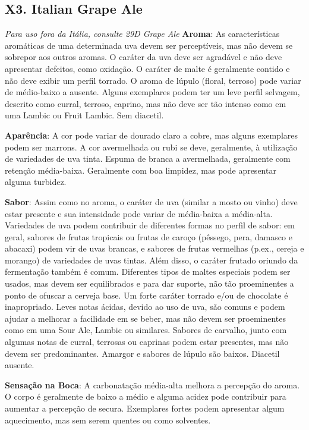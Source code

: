 \subsection*{X3. Italian Grape Ale}

\textit{Para uso fora da Itália, consulte 29D Grape Ale}
\textbf{Aroma}: As características aromáticas de uma determinada uva devem ser perceptíveis, mas não devem se sobrepor aos outros aromas. O caráter da uva deve ser agradável e não deve apresentar defeitos, como oxidação. O caráter de malte é geralmente contido e não deve exibir um perfil torrado. O aroma de lúpulo (floral, terroso) pode variar de médio-baixo a ausente. Alguns exemplares podem ter um leve perfil selvagem, descrito como curral, terroso, caprino, mas não deve ser tão intenso como em uma Lambic ou Fruit Lambic. Sem diacetil.

\textbf{Aparência}: A cor pode variar de dourado claro a cobre, mas alguns exemplares podem ser marrons. A cor avermelhada ou rubi se deve, geralmente, à utilização de variedades de uva tinta. Espuma de branca a avermelhada, geralmente com retenção média-baixa. Geralmente com boa limpidez, mas pode apresentar alguma turbidez.

\textbf{Sabor}: Assim como no aroma, o caráter de uva (similar a mosto ou vinho) deve estar presente e sua intensidade pode variar de média-baixa a média-alta. Variedades de uva podem contribuir de diferentes formas no perfil de sabor: em geral, sabores de frutas tropicais ou frutas de caroço (pêssego, pera, damasco e abacaxi) podem vir de uvas brancas, e sabores de frutas vermelhas (p.ex., cereja e morango) de variedades de uvas tintas. Além disso, o caráter frutado oriundo da fermentação também é comum. Diferentes tipos de maltes especiais podem ser usados, mas devem ser equilibrados e para dar suporte, não tão proeminentes a ponto de ofuscar a cerveja base. Um forte caráter torrado e/ou de chocolate é inapropriado. Leves notas ácidas, devido ao uso de uva, são comuns e podem ajudar a melhorar a facilidade em se beber, mas não devem ser proeminentes como em uma Sour Ale, Lambic ou similares. Sabores de carvalho, junto com algumas notas de curral, terrosas ou caprinas podem estar presentes, mas não devem ser predominantes. Amargor e sabores de lúpulo são baixos. Diacetil ausente.

\textbf{Sensação na Boca}: A carbonatação média-alta melhora a percepção do aroma. O corpo é geralmente de baixo a médio e alguma acidez pode contribuir para aumentar a percepção de secura. Exemplares fortes podem apresentar algum aquecimento, mas sem serem quentes ou como solventes.

